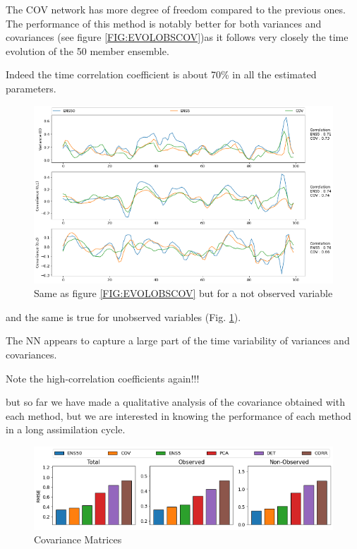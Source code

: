 \documentclass[num-refs]{wiley-article}
\begin{document}
The COV network has more degree of freedom compared to the previous ones. The performance of this method is notably better for both variances and covariances (see figure \ref{FIG:EVOLOBSCOV})as it follows very closely the time evolution of the 50 member ensemble.

Indeed the time correlation coefficient is about 70\% in all the estimated parameters.  

\begin{figure}[hbt!]
        \includegraphics[width=\textwidth]{images/evolObsCOV.png}
        \caption{Same as figure \ref{FIG:EVOLOBSCOV} but for a not observed variable }
\label{FIG:EVOLNOBSCOV}
\end{figure}

and the same is true for unobserved variables (Fig. \ref{FIG:EVOLNOBSCOV}). 

The NN appears to capture a large part of the time variability of variances and covariances. 

Note the high-correlation coefficients again!!!

but so far we have made a qualitative analysis of the covariance obtained with each method, 
but we are interested in knowing  the performance of each method in a long assimilation cycle.

\begin{figure}[hbt!]
        \includegraphics[width=\textwidth]{images/perfoComp.png}
        \caption{Covariance Matrices}
\label{FIG:COMPPERF}
\end{figure}
\end{document}
